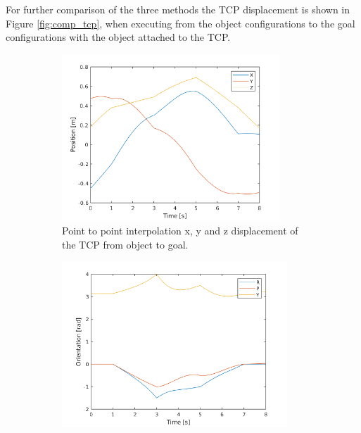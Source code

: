 \documentclass[../main.tex]{subfiles}
\begin{document}
For further comparison of the three methods the TCP displacement is shown in Figure \ref{fig:comp_tcp}, when executing from the object configurations to the goal configurations with the object attached to the TCP. 
\begin{figure}[H]
    \centering
    \begin{subfigure}[t]{0.49\textwidth}
        \centering
        \captionsetup{width=.9\textwidth}
        \includegraphics[width=0.9\textwidth]{figures/p2p_interpolation/joint_space_int_without_blend_position.png}
        \caption{Point to point interpolation x, y and z displacement of the TCP from object to goal.}
        \label{subfig:p2p_xyz}
    \end{subfigure}
    \begin{subfigure}[t]{0.49\textwidth}
        \centering
        \captionsetup{width=.9\textwidth}
        \includegraphics[width=0.93\textwidth]{figures/p2p_interpolation/joint_space_int_without_blend_orientation.png}

\end{subfigure}
\end{figure}
\end{document}
